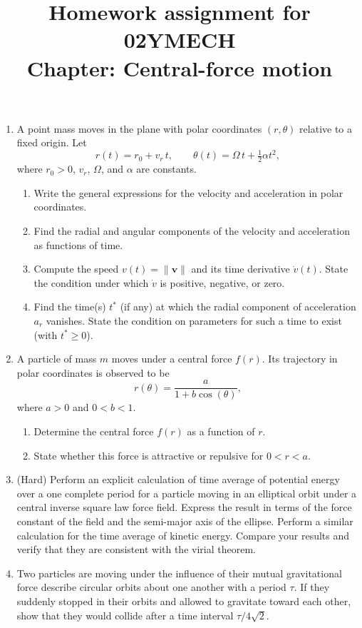 \documentclass[12pt]{article}
\title{Homework assignment for 02YMECH \\ Chapter: Central-force motion}
\begin{document}
\date{}
\maketitle
\vspace{-0.8in}

\begin{enumerate}
\item A point mass moves in the plane with polar coordinates $(r,\theta)$ relative to a fixed origin. Let
\[
r(t)=r_0+v_r\,t,\qquad \theta(t)=\Omega\,t+\tfrac{1}{2}\alpha t^2,
\]
where \(r_0>0\), \(v_r\), \(\Omega\), and \(\alpha\) are constants. 

\begin{enumerate}
  \item[(a)] Write the general expressions for the velocity and acceleration in polar coordinates.
  \item[(b)] Find the radial and angular components of the velocity and acceleration as functions of time.
  \item[(c)] Compute the speed \(v(t)=\|\mathbf v\|\) and its time derivative \(\dot v(t)\). State the condition under which \(\dot v\) is positive, negative, or zero.

  \item[(d)] Find the time(s) \(t^\ast\) (if any) at which the radial component of acceleration \(a_r\) vanishes. State the condition on parameters for such a time to exist (with \(t^\ast\ge 0\)).
\end{enumerate}
\item     A particle of mass $m$ moves under a central force $f(r)$.  
    Its trajectory in polar coordinates is observed to be
    \[
        r(\theta)=\frac{a}{1+b\cos(\theta)},
    \]
    where $a>0$ and $0<b<1$. 

    \begin{enumerate}
        \item Determine the central force $f(r)$ as a function of $r$.
        \item State whether this force is attractive or repulsive for $0<r<a$.
    \end{enumerate} 

    \item (Hard) Perform an explicit calculation of time average of potential energy over a one complete period for a particle moving in an elliptical orbit under a central inverse square law force field. Express the result in terms of the force constant of the field and the semi-major axis of the ellipse. Perform a similar calculation for the time average of kinetic energy. Compare your results and verify that they are consistent with the virial theorem.
    \item Two particles are moving under the influence of their mutual gravitational force describe circular orbits about one another with a period $\tau$. If they suddenly stopped in their orbits and allowed to gravitate toward each other, show that they would collide after a time interval $\tau/4\sqrt{2}$.


\end{enumerate}
\end{document}
